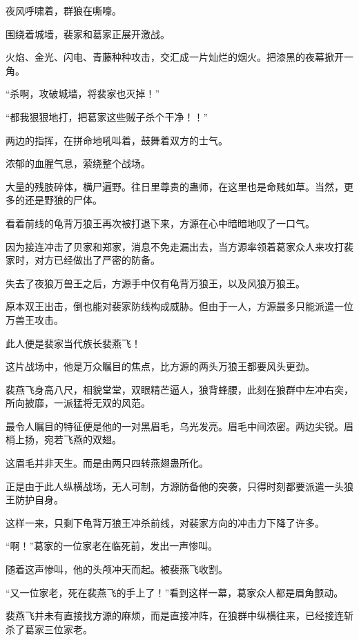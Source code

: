 
\begin{this_body}

夜风呼啸着，群狼在嘶嚎。

围绕着城墙，裴家和葛家正展开激战。

火焰、金光、闪电、青藤种种攻击，交汇成一片灿烂的烟火。把漆黑的夜幕掀开一角。

“杀啊，攻破城墙，将裴家也灭掉！”

“都我狠狠地打，把葛家这些贼子杀个干净！！”

两边的指挥，在拼命地吼叫着，鼓舞着双方的士气。

浓郁的血腥气息，萦绕整个战场。

大量的残肢碎体，横尸遍野。往日里尊贵的蛊师，在这里也是命贱如草。当然，更多的还是野狼的尸体。

看着前线的龟背万狼王再次被打退下来，方源在心中暗暗地叹了一口气。

因为接连冲击了贝家和郑家，消息不免走漏出去，当方源率领着葛家众人来攻打裴家时，对方已经做出了严密的防备。

失去了夜狼万兽王之后，方源手中仅有龟背万狼王，以及风狼万狼王。

原本双王出击，倒也能对裴家防线构成威胁。但由于一人，方源最多只能派遣一位万兽王攻击。

此人便是裴家当代族长裴燕飞！

这片战场中，他是万众瞩目的焦点，比方源的两头万狼王都要风头更劲。

裴燕飞身高八尺，相貌堂堂，双眼精芒逼人，狼背蜂腰，此刻在狼群中左冲右突，所向披靡，一派猛将无双的风范。

最令人瞩目的特征便是他的一对黑眉毛，乌光发亮。眉毛中间浓密。两边尖锐。眉梢上扬，宛若飞燕的双翅。

这眉毛并非天生。而是由两只四转燕翅蛊所化。

正是由于此人纵横战场，无人可制，方源防备他的突袭，只得时刻都要派遣一头狼王防护自身。

这样一来，只剩下龟背万狼王冲杀前线，对裴家方向的冲击力下降了许多。

“啊！”葛家的一位家老在临死前，发出一声惨叫。

随着这声惨叫，他的头颅冲天而起。被裴燕飞收割。

“又一位家老，死在裴燕飞的手上了！”看到这样一幕，葛家众人都是眉角颤动。

裴燕飞并未有直接找方源的麻烦，而是直接冲阵，在狼群中纵横往来，已经接连斩杀了葛家三位家老。


\end{this_body}
